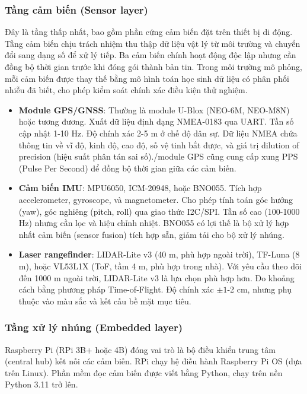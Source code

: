 \subsubsection{Tầng cảm biến (Sensor layer)}

\hspace{0.5cm} Đây là tầng thấp nhất, bao gồm phần cứng cảm biến đặt trên thiết bị di động. Tầng cảm biến chịu trách nhiệm thu thập dữ liệu vật lý từ môi trường và chuyển đổi sang dạng số để xử lý tiếp. Ba cảm biến chính hoạt động độc lập nhưng cần đồng bộ thời gian trước khi đóng gói thành bản tin. Trong môi trường mô phỏng, mỗi cảm biến được thay thế bằng mô hình toán học sinh dữ liệu có phân phối nhiễu đã biết, cho phép kiểm soát chính xác điều kiện thử nghiệm.

\begin{itemize}
    \item \textbf{Module GPS/GNSS}: Thường là module U-Blox (NEO-6M, NEO-M8N) hoặc tương đương. Xuất dữ liệu định dạng NMEA-0183 qua UART. Tần số cập nhật 1-10 Hz. Độ chính xác 2-5 m ở chế độ dân sự. Dữ liệu NMEA chứa thông tin về vĩ độ, kinh độ, cao độ, số vệ tinh bắt được, và giá trị dilution of precision (hiệu suất phân tán sai số)./module GPS cũng cung cấp xung PPS (Pulse Per Second) để đồng bộ thời gian giữa các cảm biến.
    \item \textbf{Cảm biến IMU}: MPU6050, ICM-20948, hoặc BNO055. Tích hợp accelerometer, gyroscope, và magnetometer. Cho phép tính toán góc hướng (yaw), góc nghiêng (pitch, roll) qua giao thức I2C/SPI. Tần số cao (100-1000 Hz) nhưng cần lọc và hiệu chỉnh nhiệt. BNO055 có lợi thế là bộ xử lý hợp nhất cảm biến (sensor fusion) tích hợp sẵn, giảm tải cho bộ xử lý nhúng.
    \item \textbf{Laser rangefinder}: LIDAR-Lite v3 (40 m, phù hợp ngoài trời), TF-Luna (8 m), hoặc VL53L1X (ToF, tầm 4 m, phù hợp trong nhà). Với yêu cầu theo dõi đến 1000 m ngoài trời, LIDAR-Lite v3 là lựa chọn phù hợp hơn. Đo khoảng cách bằng phương pháp Time-of-Flight. Độ chính xác $\pm 1$-2 cm, nhưng phụ thuộc vào màu sắc và kết cấu bề mặt mục tiêu.
\end{itemize}

\subsubsection{Tầng xử lý nhúng (Embedded layer)}

\hspace{0.5cm} Raspberry Pi (RPi 3B+ hoặc 4B) đóng vai trò là bộ điều khiển trung tâm (central hub) kết nối các cảm biến. RPi chạy hệ điều hành Raspberry Pi OS (dựa trên Linux). Phần mềm đọc cảm biến được viết bằng Python, chạy trên nền Python 3.11 trở lên.

